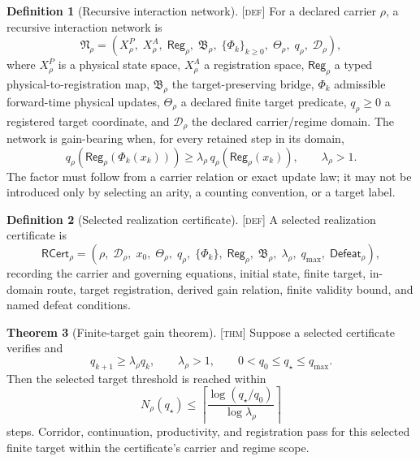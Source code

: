 \documentclass[11pt]{article}
\newcommand{\Reg}{\ensuremath{\mathsf{Reg}}}
\newcommand{\Bridge}{\ensuremath{\mathfrak{B}}}
\newcommand{\RCert}{\ensuremath{\mathsf{RCert}}}
\newcommand{\Defn}{\textsc{[def]}}
\newcommand{\Thm}{\textsc{[thm]}}
\theoremstyle{definition}
\newtheorem{sdefinition}{Definition}
\newtheorem{stheorem}[sdefinition]{Theorem}
\begin{document}
\begin{sdefinition}[Recursive interaction network]
\label{def:recursive-interaction-network}
\Defn{} For a declared carrier $\rho$, a recursive interaction network is
\begin{equation}
\mathfrak N_\rho=
\left(
X^P_\rho,\;X^A_\rho,\;\Reg_\rho,\;\Bridge_\rho,\;
\{\Phi_k\}_{k\ge0},\;\Theta_\rho,\;q_\rho,\;\mathcal D_\rho
\right),
\label{eq:recursive-interaction-network}
\end{equation}
where $X^P_\rho$ is a physical state space, $X^A_\rho$ a registration space,
$\Reg_\rho$ a typed physical-to-registration map, $\Bridge_\rho$ the
target-preserving bridge, $\Phi_k$ admissible forward-time physical updates,
$\Theta_\rho$ a declared finite target predicate, $q_\rho\ge0$ a registered
target coordinate, and $\mathcal D_\rho$ the declared carrier/regime domain.
The network is gain-bearing when, for every retained step in its domain,
\begin{equation}
q_\rho\!\left(\Reg_\rho(\Phi_k(x_k))\right)
\ge\lambda_\rho\,q_\rho\!\left(\Reg_\rho(x_k)\right),
\qquad \lambda_\rho>1.
\label{eq:physical-gain-recurrence}
\end{equation}
The factor must follow from a carrier relation or exact update law; it may not
be introduced only by selecting an arity, a counting convention, or a target
label.
\end{sdefinition}

\begin{sdefinition}[Selected realization certificate]
\label{def:selected-realization-certificate}
\Defn{} A selected realization certificate is
\begin{equation}
\RCert_\rho=
\left(
\rho,\;\mathcal D_\rho,\;x_0,\;\Theta_\rho,\;q_\rho,\;
\{\Phi_k\},\;\Reg_\rho,\;\Bridge_\rho,\;
\lambda_\rho,\;q_{\max},\;\mathsf{Defeat}_\rho
\right),
\label{eq:selected-realization-certificate}
\end{equation}
recording the carrier and governing equations, initial state, finite target,
in-domain route, target registration, derived gain relation, finite validity
bound, and named defeat conditions.
\end{sdefinition}

\begin{stheorem}[Finite-target gain theorem]
\label{thm:finite-target-gain}
\Thm{} Suppose a selected certificate verifies and
\begin{equation}
q_{k+1}\ge\lambda_\rho q_k,\qquad
\lambda_\rho>1,\qquad
0<q_0\le q_\star\le q_{\max}.
\label{eq:finite-target-gain-assumptions}
\end{equation}
Then the selected target threshold is reached within
\begin{equation}
N_\rho(q_\star)
\le
\left\lceil\frac{\log(q_\star/q_0)}{\log\lambda_\rho}\right\rceil
\label{eq:finite-target-depth}
\end{equation}
steps.  Corridor, continuation, productivity, and registration pass for this
selected finite target within the certificate's carrier and regime scope.
\end{stheorem}
\end{document}
